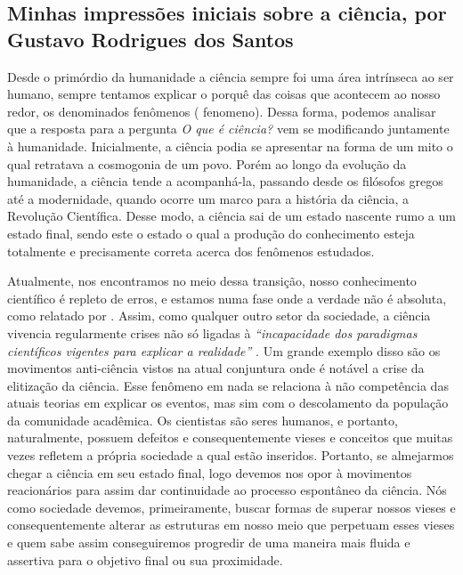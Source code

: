 \subsection{Minhas impressões iniciais sobre a ciência, por Gustavo Rodrigues dos Santos}

Desde o primórdio da humanidade a ciência sempre foi uma área intrínseca ao ser humano, sempre tentamos explicar o porquê das coisas que acontecem ao nosso redor, os denominados fenômenos ( \gls{fenomeno}). Dessa forma, podemos analisar que a resposta para a pergunta \textit{O que é ciência?} vem se modificando juntamente à humanidade. Inicialmente, a ciência podia se apresentar na forma de um mito o qual retratava a cosmogonia de um povo. Porém ao longo da evolução da humanidade, a ciência tende a acompanhá-la, passando desde os filósofos gregos até a modernidade, quando ocorre um marco para a história da ciência, a Revolução Científica. Desse modo, a ciência sai de um estado nascente rumo a um estado final, sendo este o estado o qual a produção do conhecimento esteja totalmente e precisamente correta acerca dos fenômenos estudados.

Atualmente, nos encontramos no meio dessa transição, nosso conhecimento científico é repleto de erros, e estamos numa fase onde a verdade não é absoluta, como relatado por \citet{fernandes_consideracoes_2021}. Assim, como qualquer outro setor da sociedade, a ciência vivencia regularmente crises não só ligadas à \textit{``incapacidade dos paradigmas científicos vigentes para explicar a realidade''} \citep{fernandes_consideracoes_2021}. Um grande exemplo disso são os movimentos anti-ciência vistos na atual conjuntura onde é notável a crise da elitização da ciência. Esse fenômeno em nada se relaciona à não competência das atuais teorias em explicar os eventos, mas sim com o descolamento da população da comunidade acadêmica. Os cientistas são seres humanos, e portanto, naturalmente, possuem defeitos e consequentemente vieses e conceitos que muitas vezes refletem a própria sociedade a qual estão inseridos. Portanto, se almejarmos chegar a ciência em seu estado final, logo devemos nos opor à movimentos reacionários para assim dar continuidade ao processo espontâneo da ciência. Nós como sociedade devemos, primeiramente, buscar formas de superar nossos vieses e consequentemente alterar as estruturas em nosso meio que perpetuam esses vieses e quem sabe assim conseguiremos progredir de uma maneira mais fluida e assertiva para o objetivo final ou sua proximidade.
